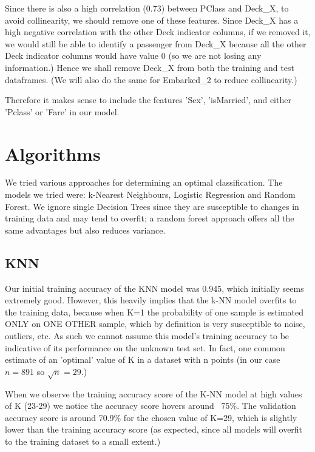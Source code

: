 \documentclass[12pt]{article}
\begin{document}
Since there is also a high correlation (0.73) between PClass and Deck\_X, to avoid collinearity, we should remove one of these features. Since Deck\_X has a high negative correlation with the other Deck indicator columns, if we removed it, we would still be able to identify a passenger from Deck\_X because all the other Deck indicator columns would have value 0 (so we are not losing any information.) Hence we shall remove Deck\_X from both the training and test dataframes. (We will also do the same for Embarked\_2 to reduce collinearity.)\newline

Therefore it makes sense to include the features 'Sex', 'isMarried', and either 'Pclass' or 'Fare' in our model.

\section{Algorithms}

We tried various approaches for determining an optimal classification. The models we tried were: k-Nearest Neighbours, Logistic Regression and Random Forest. We ignore single Decision Trees since they are susceptible to changes in training data and may tend to overfit; a random forest approach offers all the same advantages but also reduces variance.\newline

\subsection{KNN}
Our initial training accuracy of the KNN model was 0.945, which initially seems extremely good. However, this heavily implies that the k-NN model overfits to the training data, because when K=1 the probability of one sample is estimated ONLY on ONE OTHER sample, which by definition is very susceptible to noise, outliers, etc. As such we cannot assume this model's training accuracy to be indicative of its performance on the unknown test set. In fact, one common estimate of an 'optimal' value of K in a dataset with n points (in our case $n=891$ so $\sqrt{n}=29$.)\newline

When we observe the training accuracy score of the K-NN model at high values of K (23-29) we notice the accuracy score hovers around ~75\%. The validation accuracy score is around 70.9\% for the chosen value of K=29, which is slightly lower than the training accuracy score (as expected, since all models will overfit to the training dataset to a small extent.)\newline
\end{document}
